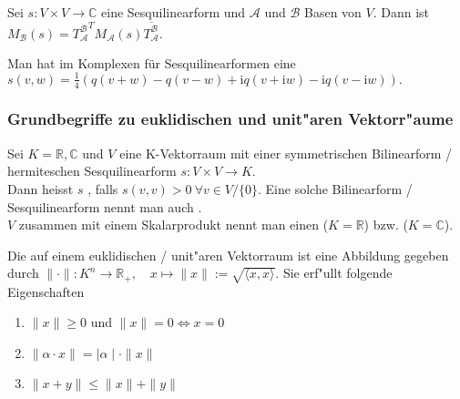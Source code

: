 \documentclass[8pt, a4paper, twocolumn, landscape]{article}
\begin{document}
\begin{theorem} 
Sei $s : V \times V \rightarrow \mathbb{C}$ eine Sesquilinearform und $\mathcal{A}$ und  $\mathcal{B}$ Basen von $V$. Dann ist
$
M_\mathcal{B}(s) = {T^\mathcal{B}_\mathcal{A}}^T M_\mathcal{A}(s) \overline{T^\mathcal{B}_\mathcal{A}}.
$
\end{theorem}





\begin{theorem} 
Man hat im Komplexen für Sesquilinearformen eine 
$
s(v, w)=\frac{1}{4}(q(v+w)-q(v-w)+\mathrm{i} q(v+\mathrm{i} w)-\mathrm{i} q(v-\mathrm{i} w)).
$
\end{theorem}




\subsubsection{Grundbegriffe zu euklidischen  und unit"aren Vektorr"aume}
\begin{definition}
Sei $K = \mathbb{R}, \mathbb{C}$ und $V$ eine K-Vektorraum mit einer symmetrischen Bilinearform / hermiteschen Sesquilinearform $s : V \times V \rightarrow K$. 
\\ Dann heisst $s$ , falls $s(v, v) > 0 \ \forall v \in V/\{0\}$.
Eine solche Bilinearform / Sesquilinearform nennt man auch .
\\$V$ zusammen mit einem Skalarprodukt nennt man einen  ($K = \mathbb{R}$) bzw.  ($K = \mathbb{C}$).
\end{definition}

\begin{definition}
Die  auf einem euklidischen / unit"aren Vektorraum ist eine Abbildung gegeben durch
$
 \|\cdot\|: K^{n} \rightarrow \mathbb{R}_{+}, \quad x \mapsto\|x\|:=\sqrt{\langle x, x\rangle}.
$
Sie erf"ullt folgende Eigenschaften
\vspace{-20pt}
\begin{multicols}{2}
\begin{enumerate}
\item $\|x\| \geq 0$ und $\|x\| = 0 \Leftrightarrow x= 0$
\item $ \| \alpha \cdot x \| = \mid\alpha \mid \cdot \|x \| $ 
\item $\|x+y\| \leq\|x\|+\|y\|$
\end{enumerate}
\end{multicols}
\end{definition}
\end{document}

